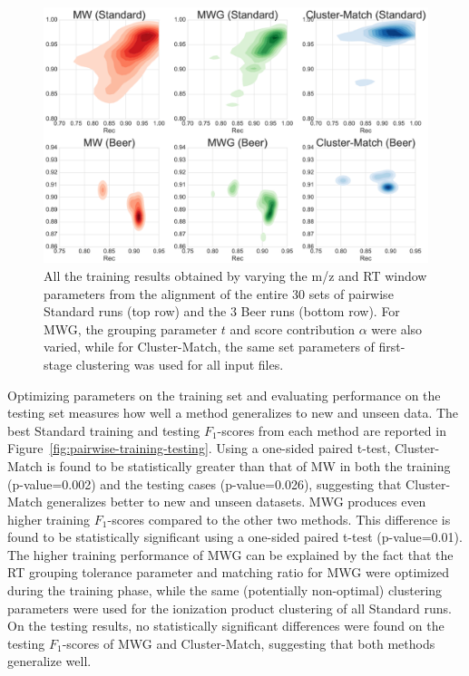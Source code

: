 \begin{figure}[!htbp]
\centering
\centering\includegraphics[width=1.0\linewidth]{05-precursor-cluster/figures/fig2.pdf}
\caption{\label{fig:training-results} All the training results obtained by varying the m/z and RT window parameters from the alignment of the entire 30 sets of pairwise Standard runs (top row) and the 3 Beer runs (bottom row). For MWG, the grouping parameter $t$ and score contribution $\alpha$ were also varied, while for Cluster-Match, the same set parameters of first-stage clustering was used for all input files.}
\end{figure}

Optimizing parameters on the training set and evaluating performance on the testing set measures how well a method generalizes to new and unseen data. The best Standard training and testing $F_1$-scores from each method are reported in Figure~\ref{fig:pairwise-training-testing}. Using a one-sided paired t-test, Cluster-Match is found to be statistically greater than that of MW in both the training (p-value=0.002) and the testing cases (p-value=0.026), suggesting that Cluster-Match generalizes better to new and unseen datasets. MWG produces even higher training $F_1$-scores compared to the other two methods. This difference is found to be statistically significant using a one-sided paired t-test (p-value=0.01). The higher training performance of MWG can be explained by the fact that the RT grouping tolerance parameter and matching ratio for MWG were optimized during the training phase, while the same (potentially non-optimal) clustering parameters were used for the ionization product clustering of all Standard runs. On the testing results, no statistically significant differences were found on the testing $F_1$-scores of MWG and Cluster-Match, suggesting that both methods generalize well. 

